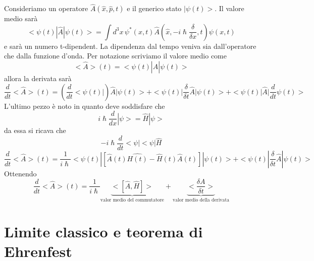\documentclass[a4paper,11pt]{report}
\theoremstyle{remark}
\theoremstyle{definition}
\begin{document}
Consideriamo un operatore $\hat{A}(\hat{x},\hat{p},t)$ e il generico stato $|\psi(t)>$. Il valore medio sarà
\begin{equation*}
    <\psi(t)|\hat{A}|\psi(t)> = \int d^3x \, \psi^*(x,t)\hat{A}\left(\hat{x},-i\hslash \frac{\delta}{\delta x}, t\right)\psi(x,t)
\end{equation*}
e sarà un numero t-dipendent. La dipendenza dal tempo veniva sia dall'operatore che dalla funzione d'onda. Per notazione scriviamo il valore medio come
\begin{equation*}
    <\hat{A}>(t)= <\psi(t)|\hat{A}|\psi(t)>
\end{equation*}
allora la derivata sarà
\begin{equation*}
    \frac{d}{dt} <\hat{A}>(t) = \left(\frac{d}{dt}<\psi(t)|\right) \hat{A}|\psi(t)> + <\psi(t)|\frac{\delta}{\delta t}\hat{A}|\psi(t)> + <\psi(t)|\hat{A}|\frac{d}{dt}\psi(t)>
\end{equation*}
L'ultimo pezzo è noto in quanto deve soddisfare che 
\begin{equation*}
    i\hslash \frac{d}{dx}|\psi> = \hat{H}|\psi>
\end{equation*}
da essa si ricava che 
\begin{equation*}
    -i\hslash \frac{d}{dt}<\psi| <\psi|\hat{H}
\end{equation*}
\begin{equation*}
    \frac{d}{dt} <\hat{A}>(t) = \frac{1}{i\hslash}<\psi(t)| [\hat{A}(t)\hat{H(t)}-\hat{H}(t)\hat{A}(t)]|\psi(t)> + <\psi(t)|\frac{\delta}{\delta t}\hat{A}| \psi(t)>
\end{equation*}
Ottenendo
\begin{equation}
    \label{*}
    \frac{d}{dt} <\hat{A}>(t) = \frac{1}{i\hslash} \underbrace{<[\hat{A},\hat{H}]>}_{\mbox{valor medio del commutatore}} + \underbrace{<\frac{\delta A}{\delta t}>}_{\mbox{valor medio della derivata}}
\end{equation}

\chapter{Limite classico e teorema di Ehrenfest}
\end{document}
